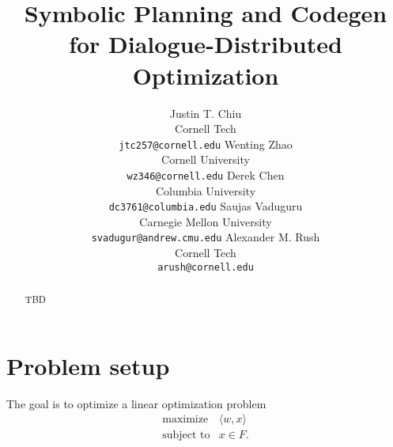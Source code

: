 \documentclass[11pt]{article}
\title{
Symbolic Planning and Codegen\\
for Dialogue-Distributed Optimization
}
\author{
Justin T. Chiu  \\
Cornell Tech \\
\texttt{jtc257@cornell.edu}
\And
Wenting Zhao \\
Cornell University \\
\texttt{wz346@cornell.edu}
\And
Derek Chen \\
Columbia University \\
\texttt{dc3761@columbia.edu}
\AND
Saujas Vaduguru \\
Carnegie Mellon University \\
\texttt{svadugur@andrew.cmu.edu}
\And
Alexander M. Rush \\
Cornell Tech \\
\texttt{arush@cornell.edu}
}
\begin{document}
\maketitle

\begin{abstract}
TBD
\end{abstract}

\section{Problem setup}
The goal is to optimize a linear optimization problem
\begin{equation}
\begin{array}{ll}
\mbox{maximize} & \langle w, x\rangle\\
\mbox{subject to} & x \in F.
\end{array}
\end{equation}
\end{document}

